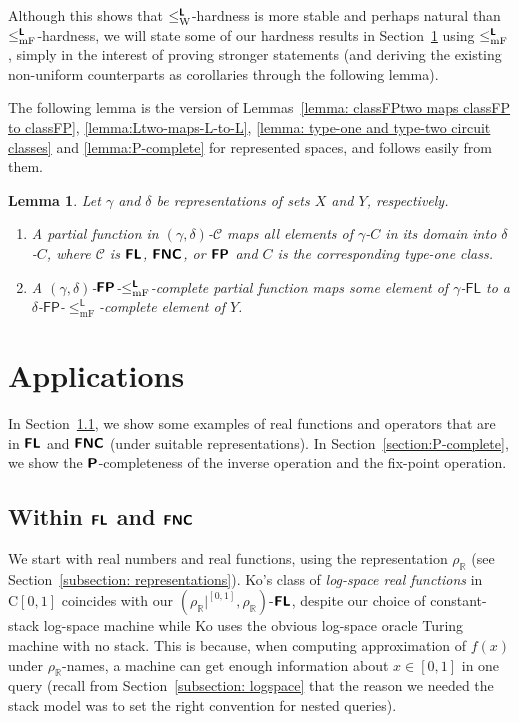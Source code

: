 \documentclass[conference]{IEEEtran}
\newcommand{\R}{\mathbb R}
\newcommand{\classonefont}[1]{\mathsf{#1}}
\newcommand{\classL}{\classonefont{L}}
\newcommand{\classFL}{\classonefont{FL}}
\newcommand{\classFP}{\classonefont{FP}}
\newcommand{\classtwofont}[1]{\text{\bfseries \sffamily \upshape #1}}
\newcommand{\classLtwo}{\classtwofont{L}}
\newcommand{\classFLtwo}{\classtwofont{FL}}
\newcommand{\classFNCtwo}{\classtwofont{FNC}}
\newcommand{\classPtwo}{\classtwofont{P}}
\newcommand{\classFPtwo}{\classtwofont{FP}}
\newcommand{\rhoR}{\rho _\R}
\newcommand{\rhoRunit}{\rho _\R|^{[0,1]}}
\newcommand{\redW}{\leq _{\mathrm W}}
\newcommand{\redmF}{\leq _{\mathrm{mF}}}
\newcommand{\redLW}{\redW ^{\classLtwo}}
\newcommand{\redLmF}{\redmF ^{\classLtwo}}
\newcommand{\classC}{\mathrm C}
\newtheorem{lemma}[theorem]{Lemma}
\theoremstyle{definition}
\theoremstyle{remark}
\begin{document}
Although this shows that $\redLW$-hardness is 
more stable and perhaps natural 
than $\redLmF$-hardness, 
we will state some of our hardness results in Section~\ref{section:applications}
using $\redLmF$, 
simply in the interest of proving stronger statements
(and deriving the existing non-uniform counterparts as corollaries
through the following lemma). 

The following lemma is the version of 
Lemmas~\ref{lemma: classFPtwo maps classFP to classFP}, 
\ref{lemma:Ltwo-maps-L-to-L}, 
\ref{lemma: type-one and type-two circuit classes} and 
\ref{lemma:P-complete} for represented spaces, 
and follows easily from them. 

\begin{lemma}
\label{lemma:p-comp-maps-l-to-p-comp}
 Let $\gamma$ and $\delta$ be representations of sets $X$ and $Y$, respectively.
\begin{enumerate}
\item
 A partial function in $(\gamma, \delta)$-$\mathcal C$
 maps all elements of $\gamma$-$C$ in its domain into $\delta$-$C$, 
 where $\mathcal C$ is $\classFLtwo$, $\classFNCtwo$, or $\classFPtwo$ 
 and $C$ is the corresponding type-one class. 
\item \label{enumi:p-comp-maps-l-to-p-comp}
 A $(\gamma, \delta)$-$\classFPtwo$-$\redLmF$-complete partial function 
 maps some element of $\gamma$-$\classFL$ 
 to a $\delta$-$\classFP$-$\redmF^\classL$-complete element of $Y$.
\end{enumerate}
\end{lemma}

\section{Applications}
\label{section:applications}

In Section~\ref{section:function}, 
we show some examples of real functions and operators 
that are in $\classFLtwo$ and $\classFNCtwo$ (under suitable representations). 
In Section~\ref{section:P-complete}, we show the $\classPtwo$-completeness of 
the inverse operation and the fix-point operation.

\subsection{Within $\classFLtwo$ and $\classFNCtwo$}
\label{section:function}

We start with real numbers and real functions, 
using the representation $\rhoR$
(see Section~\ref{subsection: representations}). 
Ko's class of
\emph{log-space real functions} in $\classC[0,1]$ 
\cite{ko1991complexity} 
coincides with our $(\rhoRunit, \rhoR)$-$\classFLtwo$, 
despite our choice of constant-stack log-space machine 
while Ko uses the obvious log-space oracle Turing machine 
with no stack.
This is because, 
when computing approximation of $f(x)$ under $\rhoR$-names, 
a machine can get enough information about $x \in [0,1]$ in one query
(recall from Section~\ref{subsection: logspace} that 
the reason we needed the stack model 
was to set the right convention for nested queries).
\end{document}
